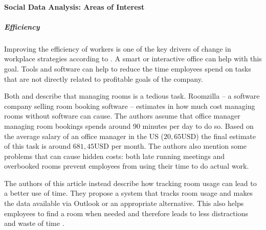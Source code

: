 

\paragraph{Social Data Analysis: Areas of Interest}
\subparagraph{Efficiency}\label{sec:sda-efficiency}
Improving the efficiency of workers is one of the key drivers of change in workplace strategies 
according to \cite{hub13}. A smart or interactive office can help with this goal. Tools and software 
can help to reduce the time employees spend on tasks that are not directly related to profitable 
goals of the company.

Both \cite{iotagenda} and \cite{roomzilla9} describe that managing rooms is a tedious task. 
Roomzilla -- a software company selling room booking software -- estimates in \cite{roomzilla9} how 
much cost managing rooms without software can cause. The authors assume that office manager managing 
room bookings spends around 90 minutes per day to do so. Based on the average salary of an office 
manager in the US (\(20,65\text{USD}\)) the final estimate of this task is around \(681,45\text{USD}\) 
per month. The authors also mention some problems that can cause hidden costs: both late running 
meetings and overbooked rooms prevent employees from using their time to do actual work. 

The authors of this article instead describe how tracking room usage can lead to a better use of 
time. They propose a system that tracks room usage and makes the data available via Outlook or an 
appropriate alternative. This also helps employees to find a room when needed and therefore leads to 
less distractions and waste of time \cite{iotagenda}.

